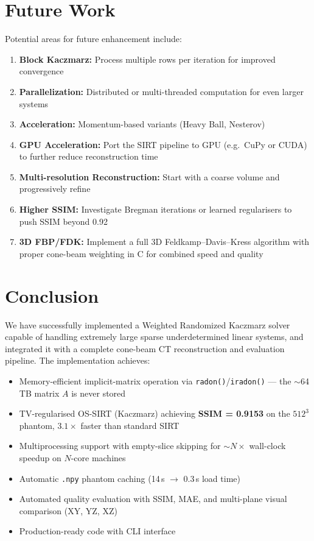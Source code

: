 \documentclass[11pt,a4paper]{article}
\begin{document}
\section{Future Work}

Potential areas for future enhancement include:
\begin{enumerate}
    \item \textbf{Block Kaczmarz:} Process multiple rows per iteration for improved convergence
    \item \textbf{Parallelization:} Distributed or multi-threaded computation for even larger systems
    \item \textbf{Acceleration:} Momentum-based variants (Heavy Ball, Nesterov)
    \item \textbf{GPU Acceleration:} Port the SIRT pipeline to GPU (e.g.\ CuPy or CUDA) to further reduce reconstruction time
    \item \textbf{Multi-resolution Reconstruction:} Start with a coarse volume and progressively refine
    \item \textbf{Higher SSIM:} Investigate Bregman iterations or learned regularisers to push SSIM beyond 0.92
    \item \textbf{3D FBP/FDK:} Implement a full 3D Feldkamp--Davis--Kress algorithm with proper cone-beam weighting in C for combined speed and quality
\end{enumerate}

\section{Conclusion}

We have successfully implemented a Weighted Randomized Kaczmarz solver capable of handling extremely large sparse underdetermined linear systems, and integrated it with a complete cone-beam CT reconstruction and evaluation pipeline. The implementation achieves:

\begin{itemize}
    \item Memory-efficient implicit-matrix operation via \texttt{radon()}/\texttt{iradon()} --- the $\sim$64\,TB matrix $A$ is never stored
    \item TV-regularised OS-SIRT (Kaczmarz) achieving \textbf{SSIM = 0.9153} on the $512^3$ phantom, $3.1\times$ faster than standard SIRT
    \item Multiprocessing support with empty-slice skipping for $\sim N\times$ wall-clock speedup on $N$-core machines
    \item Automatic \texttt{.npy} phantom caching (14\,s $\to$ 0.3\,s load time)
    \item Automated quality evaluation with SSIM, MAE, and multi-plane visual comparison (XY, YZ, XZ)
    \item Production-ready code with CLI interface
\end{itemize}
\end{document}
